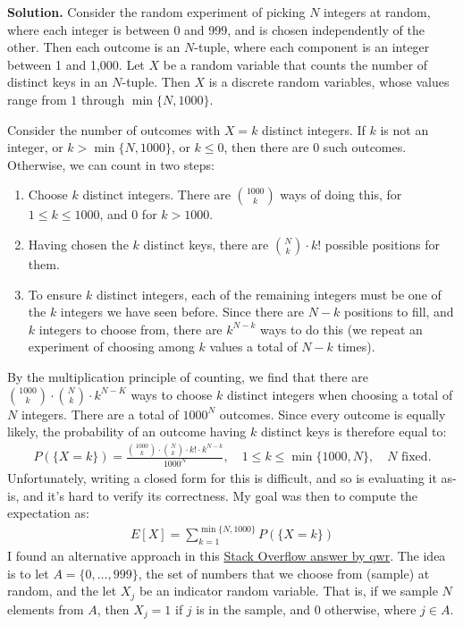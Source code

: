\documentclass[12pt, a4paper]{article}
\newenvironment{sol}[1][Solution]
{\par\medskip\noindent \textbf{#1.} }
{\medskip}
\begin{document}
	\begin{sol}
		Consider the random experiment of picking $N$ integers at random, where
		each integer is between 0 and 999, and is chosen independently of the other.
		Then each outcome is an $N$-tuple, where each component is an integer between 1 and 1,000.
		Let $X$ be a random variable that counts the number of distinct keys in an $N$-tuple.
		Then $X$ is a discrete random variables, whose values range from $1$ through
		$\min\{N, 1000\}$.
		
		Consider the number of outcomes with $X=k$ distinct integers. If $k$
		is not an integer, or $k >\min\{N, 1000\}$, or $k \leq 0$, then there are
		$0$ such outcomes. Otherwise, we can count in two steps:
		\begin{enumerate}[label=(\roman*)]
			\item Choose $k$ distinct integers. There are $\binom{1000}{k}$ ways
			of doing this, for $1\leq k\leq 1000$, and $0$ for $k>1000$.
			\item Having chosen the $k$ distinct keys, there are $\binom{N}{k}\cdot k!$
			possible positions for them.
			\item To ensure $k$ distinct integers, each of the remaining integers
			must be one of the $k$ integers we have seen before. Since there are $N-k$
			positions to fill, and $k$ integers to choose from, there are $k^{N-k}$ ways
			to do this (we repeat an experiment of choosing among $k$ values a total
			of $N-k$ times).
		\end{enumerate}
		By the multiplication principle of counting, we find that there are
		$\binom{1000}{k}\cdot \binom{N}{k}\cdot  k^{N-K}$ ways to choose $k$ distinct integers
		when choosing a total of $N$ integers. There are a total of $1000^N$ outcomes.
		Since every outcome is equally likely, the probability of an outcome having
		$k$ distinct keys is therefore equal to:
		\begin{align*}
			P(\{X=k\})=\frac{\binom{1000}{k}\cdot \binom{N}{k}\cdot k!\cdot  k^{N-k}}{1000^N},
			\quad 1\leq k\leq \min\{1000, N\},\quad N \text{ fixed}.
		\end{align*}
		Unfortunately, writing a closed form for this is difficult, and so is evaluating it
		as-is, and it's hard to verify its correctness. My goal was then to compute
		the expectation as:
		\begin{align*}
			E[X] = \sum_{k=1}^{\min\{N, 1000\}}P(\{X=k\})
		\end{align*}
		I found an alternative approach in this \href{https://math.stackexchange.com/a/2770036}{Stack Overflow answer by qwr}.
		The idea is to let $A=\{0,\ldots,999\}$, the set of numbers that we choose from
		(sample) at random, and the let $X_j$ be an indicator random variable.
		That is, if we sample $N$ elements from $A$, then $X_j=1$ if $j$ is in the
		sample, and $0$ otherwise, where $j\in A$.
		

\end{sol}
\end{document}
